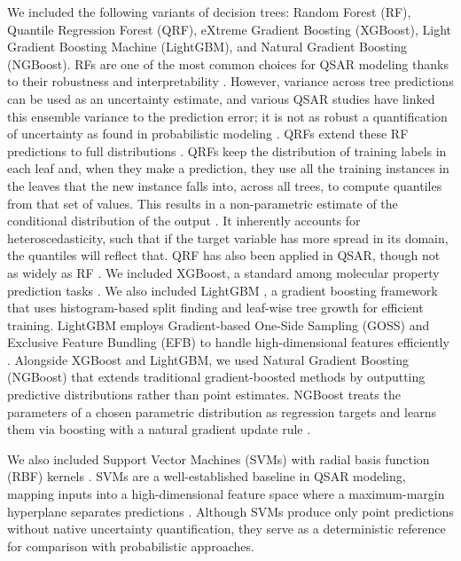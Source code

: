 \documentclass[pdflatex,sn-mathphys-num]{sn-jnl}%
\theoremstyle{thmstyleone}%
\theoremstyle{thmstyletwo}%
\theoremstyle{thmstylethree}%
\begin{document}
We included the following variants of decision trees: Random Forest (RF), Quantile Regression Forest (QRF), eXtreme Gradient Boosting (XGBoost), Light Gradient Boosting Machine (LightGBM), and Natural Gradient Boosting (NGBoost). RFs are one of the most common choices for QSAR modeling thanks to their robustness and interpretability \citep{Svetnik2003}. However, variance across tree predictions can be used as an uncertainty estimate, and various QSAR studies have linked this ensemble variance to the prediction error; it is not as robust a quantification of uncertainty as found in probabilistic modeling  \citep{Svetnik2003}.  QRFs extend these RF predictions to full distributions \citep{Meinshausen2006}. QRFs keep the distribution of training labels in each leaf and, when they make a prediction, they use all the training instances in the leaves that the new instance falls into, across all trees, to compute quantiles from that set of values. This results in a non-parametric estimate of the conditional distribution of the output \citep{Meinshausen2006}. It inherently accounts for heteroscedasticity, such that if the target variable has more spread in its domain, the quantiles will reflect that. QRF has also been applied in QSAR, though not as widely as RF \citep{Venkatraman2021}. We included XGBoost, a standard among molecular property prediction tasks \citep{Mustapha2016, Tian2022}. We also included LightGBM \citep{ke2017lightgbm}, a gradient boosting framework that uses histogram-based split finding and leaf-wise tree growth for efficient training. LightGBM employs Gradient-based One-Side Sampling (GOSS) and Exclusive Feature Bundling (EFB) to handle high-dimensional features efficiently \citep{ke2017lightgbm}. Alongside XGBoost and LightGBM, we used Natural Gradient Boosting (NGBoost) \citep{Duan2020} that extends traditional gradient-boosted methods by outputting predictive distributions rather than point estimates. NGBoost treats the parameters of a chosen parametric distribution as regression targets and learns them via boosting with a natural gradient update rule \citep{Duan2020}.

We also included Support Vector Machines (SVMs) with radial basis function (RBF) kernels \citep{Vapnik1995}. SVMs are a well-established baseline in QSAR modeling, mapping inputs into a high-dimensional feature space where a maximum-margin hyperplane separates predictions \citep{Svetnik2003}. Although SVMs produce only point predictions without native uncertainty quantification, they serve as a deterministic reference for comparison with probabilistic approaches.
\end{document}
